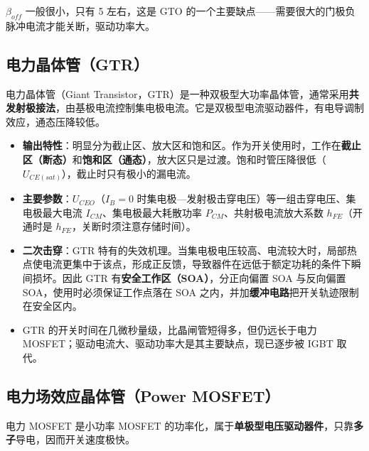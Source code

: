 
$\beta_{off}$ 一般很小，只有 5 左右，这是 GTO 的一个主要缺点——需要很大的门极负脉冲电流才能关断，驱动功率大。

\subsection{电力晶体管（GTR）}

电力晶体管（Giant Transistor，GTR）是一种双极型大功率晶体管，通常采用\textbf{共发射极接法}，由基极电流控制集电极电流。它是双极型电流驱动器件，有电导调制效应，通态压降较低。

\begin{itemize}
  \item \textbf{输出特性}：明显分为截止区、放大区和饱和区。作为开关使用时，工作在\textbf{截止区（断态）}和\textbf{饱和区（通态）}，放大区只是过渡。饱和时管压降很低（$U_{CE(sat)}$），截止时只有极小的漏电流。
  \item \textbf{主要参数}：$U_{CEO}$（$I_B=0$ 时集电极—发射极击穿电压）等一组击穿电压、集电极最大电流 $I_{CM}$、集电极最大耗散功率 $P_{CM}$、共射极电流放大系数 $h_{FE}$（开通时是 $h_{FE}$，关断时须注意存储时间）。
  \item \textbf{二次击穿}：GTR 特有的失效机理。当集电极电压较高、电流较大时，局部热点使电流更集中于该点，形成正反馈，导致器件在远低于额定功耗的条件下瞬间损坏。因此 GTR 有\textbf{安全工作区（SOA）}，分正向偏置 SOA 与反向偏置 SOA，使用时必须保证工作点落在 SOA 之内，并加\textbf{缓冲电路}把开关轨迹限制在安全区内。
  \item GTR 的开关时间在几微秒量级，比晶闸管短得多，但仍远长于电力 MOSFET；驱动电流大、驱动功率大是其主要缺点，现已逐步被 IGBT 取代。
\end{itemize}

\subsection{电力场效应晶体管（Power MOSFET）}

电力 MOSFET 是小功率 MOSFET 的功率化，属于\textbf{单极型电压驱动器件}，只靠\textbf{多子}导电，因而开关速度极快。

